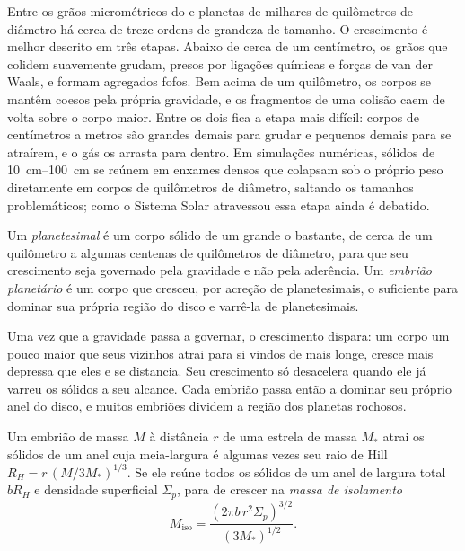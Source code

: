Entre os grãos micrométricos do  e planetas de milhares
de quilômetros de diâmetro há cerca de treze ordens de grandeza de tamanho. O crescimento é
melhor descrito em três etapas. Abaixo de cerca de um centímetro, os grãos que colidem
suavemente grudam, presos por ligações químicas e forças de van der Waals, e formam agregados
fofos. Bem acima de um quilômetro, os corpos se mantêm coesos pela própria gravidade,
e os fragmentos de uma colisão caem de volta sobre o corpo maior. Entre os dois
fica a etapa mais difícil: corpos de centímetros a metros são grandes demais para grudar
e pequenos demais para se atraírem, e o gás os arrasta para dentro. Em
simulações numéricas, sólidos de \qtyrange{10}{100}{cm} se reúnem em enxames
densos que colapsam sob o próprio peso diretamente em corpos de quilômetros
de diâmetro, saltando os tamanhos problemáticos; como o Sistema Solar atravessou essa etapa
ainda é debatido.

\begin{definition}
\label{def:b2:planet-formation-meteorites:planetesimal}
Um \emph{planetesimal} é um corpo sólido de um 
grande o bastante, de cerca de um quilômetro a algumas centenas de quilômetros de diâmetro,
para que seu crescimento seja governado pela gravidade e não pela aderência. Um
\emph{embrião planetário} é um corpo que cresceu, por
acreção de planetesimais, o suficiente para dominar sua própria região do disco e
varrê-la de planetesimais.
\end{definition}

Uma vez que a gravidade passa a governar, o crescimento dispara: um corpo um pouco maior que seus
vizinhos atrai para si  vindos de mais longe, cresce mais depressa
que eles e se distancia. Seu crescimento só desacelera quando ele já varreu os
sólidos a seu alcance. Cada embrião passa então a dominar seu próprio anel do disco,
e muitos embriões dividem a região dos planetas rochosos.

\begin{proposition}\label{prop:b2:planet-formation-meteorites:isolation}
Um embrião de massa $M$ à distância $r$ de uma estrela de massa $M_*$ atrai os
sólidos de um anel cuja meia-largura é algumas vezes seu raio de Hill
$R_H = r\,(M/3M_*)^{1/3}$. Se ele reúne todos os sólidos de um anel de largura
total $bR_H$ e densidade superficial $\Sigma_p$, para de crescer na
\emph{massa de isolamento}
\[
  M_{\mathrm{iso}} = \frac{(2\pi b\, r^2 \Sigma_p)^{3/2}}{(3M_*)^{1/2}} .
\]
\end{proposition}

